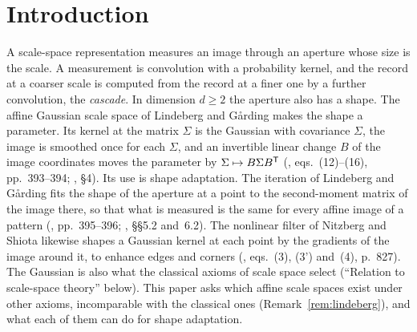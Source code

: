 \section{Introduction}\label{sec:introduction}

A scale-space representation measures an image through an aperture whose size is the scale. A
measurement is convolution with a probability kernel, and the record at a coarser scale is computed
from the record at a finer one by a further convolution, the \emph{cascade}. In dimension $d \ge 2$
the aperture also has a shape. The affine Gaussian scale space of Lindeberg and G\aa{}rding makes the
shape a parameter. Its kernel at the matrix $\Sigma$ is the Gaussian with covariance $\Sigma$, the
image is smoothed once for each $\Sigma$, and an invertible linear change $B$ of the image coordinates
moves the parameter by $\Sigma \mapsto B\Sigma B^{\mathsf{T}}$ (,
eqs.~(12)--(16), pp.~393--394; , \S4). Its use is shape adaptation. The iteration of Lindeberg and
G\aa{}rding fits the shape of the aperture at a point to the second-moment matrix of the image there,
so that what is measured is the same for every affine image of a pattern (,
pp.~395--396; , \S\S5.2 and~6.2). The nonlinear filter of Nitzberg and Shiota likewise
shapes a Gaussian kernel at each point by the gradients of the image around it, to enhance edges and corners
(, eqs.~(3), (3') and~(4), p.~827). The Gaussian is also what the classical axioms of scale
space select (``Relation to scale-space theory'' below). This paper asks which affine scale spaces
exist under other axioms, incomparable with the classical ones (Remark~\ref{rem:lindeberg}), and what
each of them can do for shape adaptation.

